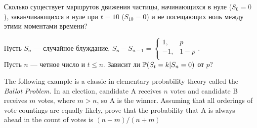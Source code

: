 \begin{problem}
Сколько существует маршрутов движения частицы, начинающихся в нуле
($S_{0}=0$), заканчивающихся в нуле при $t=10$ ($S_{10}=0$) и не
посещающих ноль между этими моментами времени? 
\end{problem} 
\begin{solution} 

\end{solution}

\begin{problem}
Пусть $S_{n}$ --- случайное блуждание, $S_{n}-S_{n-1}=
\begin{cases}
  1, & p \\
  -1, & 1-p \\
\end{cases}$. \\
Пусть $n$ --- четное число и $t\le n$. Зависит ли
$\P(S_{t}=k|S_{n}=0)$ от $p$?
\end{problem} 
\begin{solution} 

\end{solution}

\begin{problem}
 The following example is a classic in elementary probability theory called
the \emph{Ballot Problem.}  In an election, candidate A receives $n$
votes and candidate B receives $m$ votes, where $m > n$, so A is the
winner.  Assuming that all orderings of vote countings are equally
likely, prove that the probability that A is always ahead in the count of votes 
is $(n-m)/(n+m)$ 
\end{problem} 
\begin{solution} 

\end{solution}

